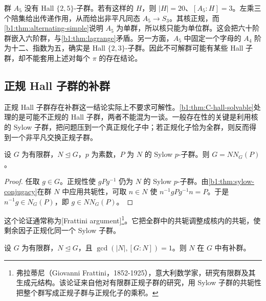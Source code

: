 \begin{example}\label{b1:exm:C-A5-hall-failure}
	群 \(A_5\) 没有 Hall \(\{2,5\}\)-子群。若有这样的 \(H\)，则 \(|H|=20\)、\([A_5:H]=3\)。左乘三个陪集给出传递作用，从而给出非平凡同态 \(A_5\rightarrow S_3\)。其核正规，而\cref{b1:thm:alternating-simple}说明 \(A_5\) 为单群，所以核只能为单位群。这会把六十阶群嵌入六阶群，与\cref{b1:thm:lagrange}矛盾。另一方面，\(A_5\) 中固定一个字母的 \(A_4\) 阶为十二、指数为五，确实是 Hall \(\{2,3\}\)-子群。因此不可解群可能有某些 Hall 子群，却不能套用上述对每个 \(\pi\) 的存在结论。
\end{example}

\subsection{正规 Hall 子群的补群}
\label{b1:subsec:C06:04}

正规 Hall 子群存在补群这一结论实际上不要求可解性。\cref{b1:thm:C-hall-solvable}处理的是可能不正规的 Hall 子群，两者不能混为一谈。一般存在性的关键是利用核的 Sylow 子群，把问题压到一个真正规化子中；若正规化子恰为全群，则反而得到一个非平凡交换正规子群。

\begin{lemma}\label{b1:lem:C-frattini-argument}
	设 \(G\) 为有限群，\(N\trianglelefteq G\)，\(p\) 为素数，\(P\) 为 \(N\) 的 Sylow \(p\)-子群。则 \(G=NN_G(P)\)。
\end{lemma}

\begin{proof}
	任取 \(g\in G\)。正规性使 \(gPg^{-1}\) 仍为 \(N\) 的 Sylow \(p\)-子群。由\cref{b1:thm:sylow-conjugacy}在群 \(N\) 中应用共轭性，可取 \(n\in N\) 使 \(n^{-1}gPg^{-1}n=P\)。于是 \(n^{-1}g\in N_G(P)\)，即 \(g\in NN_G(P)\)。
\end{proof}

这个论证通常称为[Frattini argument]\footnote{弗拉蒂尼（Giovanni Frattini，1852-1925），意大利数学家，研究有限群及其生成元结构。该论证来自他对有限群正规子群的研究，用 Sylow 子群的共轭性把整个群写成正规子群与正规化子的乘积。}。它把全群中的共轭调整成核内的共轭，使剩余因子正规化同一个 Sylow 子群。

\begin{theorem}\label{b1:thm:C-schur-zassenhaus-existence}
	设 \(G\) 为有限群，\(N\trianglelefteq G\)，且 \(\gcd(|N|,[G:N])=1\)。则 \(N\) 在 \(G\) 中有补群。
\end{theorem}

